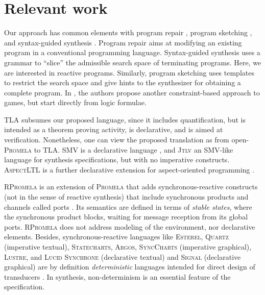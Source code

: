 \documentclass[copyright]{eptcs}
\begin{document}

\clearpage{}
\clearpage{}\section{Relevant work}
\label{sec:relevant-work}

Our approach has common elements with program repair \cite{Jobstmann05cav}, program sketching \cite{Lezama08phd}, and syntax-guided synthesis \cite{Alur2013fmcad}.
Program repair aims at modifying an existing program in a conventional programming language.
Syntax-guided synthesis uses a grammar to “slice” the admissible search space of terminating programs.
Here, we are interested in reactive programs.
Similarly, program sketching uses templates to restrict the search space and give hints to the synthesizer for obtaining a complete program.
In \cite{Beyene2014popl}, the authors propose another constraint-based approach to games, but start directly from logic formulae.

TLA \cite{Lamport94tpls,Lamport02} subsumes our proposed language, since it includes quantification, but is intended as a theorem proving activity, is declarative, and is aimed at verification.
Nonetheless, one can view the proposed translation as from open-\textsc{Promela} to TLA.
\textsc{SMV} is a declarative language \cite{Cavada10nusmv}, and \textsc{Jtlv} \cite{Pnueli10cav} an \textsc{SMV}-like language for synthesis specifications, but with no imperative constructs.
\textsc{AspectLTL} is a further declarative extension for aspect-oriented programming \cite{Maoz11aosd}.

\textsc{RPromela} is an extension of \textsc{Promela} that adds synchronous-reactive constructs (not in the sense of reactive synthesis) that include synchronous products and channels called ports \cite{Najm96spin,Najm96tacas}.
Its semantics are defined in terms of {\em stable states}, where the synchronous product blocks, waiting for message reception from its global ports.
\textsc{RPromela} does not address modeling of the environment, nor declarative elements.
Besides, synchronous-reactive languages like \textsc{Esterel}, \textsc{Quartz} (imperative textual), \textsc{Statecharts}, \textsc{Argos}, \textsc{SyncCharts} (imperative graphical), \textsc{Lustre}, and \textsc{Lucid Synchrone} (declarative textual) and \textsc{Signal} (declarative graphical) are by definition {\em deterministic} languages intended for direct design of transducers \cite{Gamatie09,Halbwachs92,Jourdan94iccl}.
In synthesis, non-determinism is an essential feature of the specification.
\end{document}
